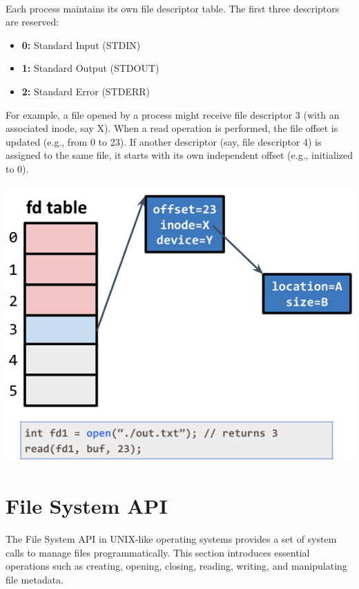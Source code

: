 \documentclass[../../compsys.tex]{subfiles}
\begin{document}
\begin{example}
\leavevmode
\\[5px]
\noindent
\begin{minipage}{0.45\textwidth}
Each process maintains its own file descriptor table. The first three descriptors are reserved:
\begin{itemize}
  \item[] \textbf{0:} Standard Input (STDIN)
  \item[] \textbf{1:} Standard Output (STDOUT)
  \item[] \textbf{2:} Standard Error (STDERR)
\end{itemize}
For example, a file opened by a process might receive file descriptor 3 (with an associated inode, say X). When a read operation is performed, the file offset is updated (e.g., from 0 to 23). If another descriptor (say, file descriptor 4) is assigned to the same file, it starts with its own independent offset (e.g., initialized to 0).
\end{minipage}%
\hfill
\vline
\hfill
\begin{minipage}{0.45\textwidth}
\begin{center}
  \includegraphics[width=1\textwidth]{chapters/l6/images/ops.png}
\end{center}
\end{minipage}
\end{example}

\newpage

\section{File System API}
The File System API in UNIX-like operating systems provides a set of system calls to manage files programmatically. This section introduces essential operations such as creating, opening, closing, reading, writing, and manipulating file metadata.
\end{document}

